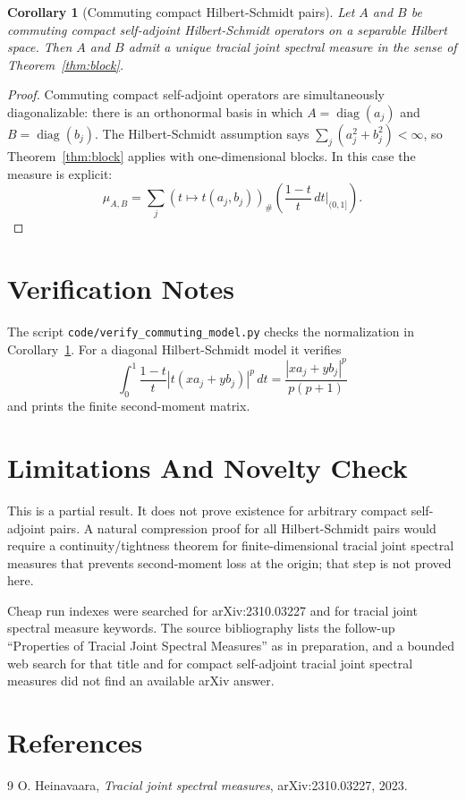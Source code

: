 \documentclass[11pt]{article}
\newtheorem{corollary}{Corollary}
\begin{document}
\begin{corollary}[Commuting compact Hilbert-Schmidt pairs]\label{cor:commuting}
Let $A$ and $B$ be commuting compact self-adjoint Hilbert-Schmidt operators on
a separable Hilbert space.  Then $A$ and $B$ admit a unique tracial joint
spectral measure in the sense of Theorem~\ref{thm:block}.
\end{corollary}

\begin{proof}
Commuting compact self-adjoint operators are simultaneously diagonalizable:
there is an orthonormal basis in which $A=\operatorname{diag}(a_j)$ and
$B=\operatorname{diag}(b_j)$.  The Hilbert-Schmidt assumption says
$\sum_j(a_j^2+b_j^2)<\infty$, so Theorem~\ref{thm:block} applies with
one-dimensional blocks.  In this case the measure is explicit:
\[
  \mu_{A,B}=\sum_j (t\mapsto t(a_j,b_j))_\#
  \left(\frac{1-t}{t}\,dt\bigg|_{(0,1]}\right).
\]
\end{proof}

\section*{Verification Notes}

The script \texttt{code/verify\_commuting\_model.py} checks the normalization
in Corollary~\ref{cor:commuting}.  For a diagonal Hilbert-Schmidt model it
verifies
\[
  \int_0^1 \frac{1-t}{t}|t(xa_j+yb_j)|^p\,dt
  =\frac{|xa_j+yb_j|^p}{p(p+1)}
\]
and prints the finite second-moment matrix.

\section*{Limitations And Novelty Check}

This is a partial result.  It does not prove existence for arbitrary compact
self-adjoint pairs.  A natural compression proof for all Hilbert-Schmidt pairs
would require a continuity/tightness theorem for finite-dimensional tracial
joint spectral measures that prevents second-moment loss at the origin; that
step is not proved here.

Cheap run indexes were searched for arXiv:2310.03227 and for tracial joint
spectral measure keywords.  The source bibliography lists the follow-up
``Properties of Tracial Joint Spectral Measures'' as in preparation, and a
bounded web search for that title and for compact self-adjoint tracial joint
spectral measures did not find an available arXiv answer.

\section*{References}

\begin{thebibliography}{9}
O. Heinavaara, \emph{Tracial joint spectral measures}, arXiv:2310.03227,
2023.
\end{thebibliography}
\end{document}
